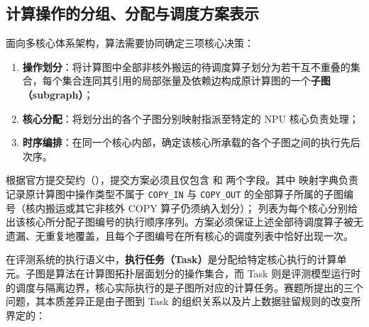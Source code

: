 \documentclass[anonymous,notoc]{gmcm2026}
\providecommand{\tightlist}{\setlength{\itemsep}{0pt}\setlength{\parskip}{0pt}}
\begin{document}
\subsection{计算操作的分组、分配与调度方案表示}

面向多核心体系架构，算法需要协同确定三项核心决策：

\begin{enumerate}
\def\labelenumi{\arabic{enumi}.}
\tightlist
\item
  \textbf{操作划分}：将计算图中全部非核外搬运的待调度算子划分为若干互不重叠的集合，每个集合连同其引用的局部张量及依赖边构成原计算图的一个\textbf{子图（subgraph）}；
\item
  \textbf{核心分配}：将划分出的各个子图分别映射指派至特定的 NPU 核心负责处理；
\item
  \textbf{时序编排}：在同一个核心内部，确定该核心所承载的各个子图之间的执行先后次序。
\end{enumerate}

根据官方提交契约（\texttt{}），提交方案必须且仅包含 \texttt{} 和 \texttt{} 两个字段。其中 \texttt{} 映射字典负责记录原计算图中操作类型不属于 \texttt{COPY\_IN} 与 \texttt{COPY\_OUT} 的全部算子所属的子图编号（核内搬运或其它非核外 COPY 算子仍须纳入划分）；\texttt{} 列表为每个核心分别给出该核心所分配子图编号的执行顺序序列。方案必须保证上述全部待调度算子被无遗漏、无重复地覆盖，且每个子图编号在所有核心的调度列表中恰好出现一次。

在评测系统的执行语义中，\textbf{执行任务（Task）}是分配给特定核心执行的计算单元。子图是算法在计算图拓扑层面划分的操作集合，而 Task 则是评测模型运行时的调度与隔离边界，核心实际执行的是子图所对应的计算任务。赛题所提出的三个问题，其本质差异正是由子图到 Task 的组织关系以及片上数据驻留规则的改变所界定的：
\end{document}
